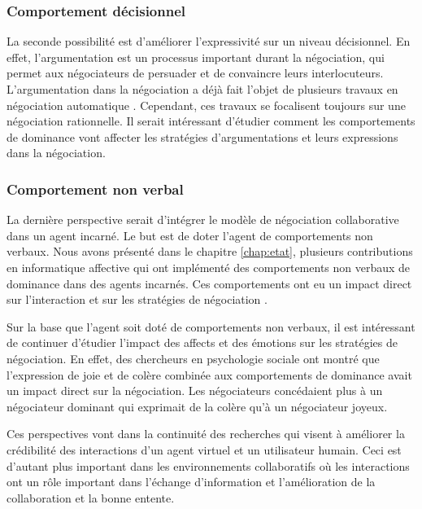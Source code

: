\subsubsection{Comportement décisionnel}

La seconde possibilité est d'améliorer l'expressivité sur un niveau décisionnel. En effet, l'argumentation est un processus important durant la négociation, qui permet aux négociateurs de persuader et de convaincre leurs interlocuteurs. L'argumentation dans la négociation a déjà fait l'objet de plusieurs travaux en négociation automatique \cite{toni2010argumentative,oliva2010argumentation}. Cependant, ces travaux se focalisent toujours sur une négociation rationnelle. Il serait intéressant d'étudier comment les comportements de dominance vont affecter les stratégies d'argumentations et leurs expressions dans la négociation.

\subsubsection{Comportement non verbal}

La dernière perspective serait d'intégrer le modèle de négociation collaborative dans un agent incarné. Le but est de doter l'agent de comportements non verbaux. Nous avons présenté dans le chapitre \ref{chap:etat}, plusieurs contributions en informatique affective qui ont implémenté des comportements non verbaux de dominance dans des agents incarnés. Ces comportements ont eu un impact direct sur l'interaction et sur les stratégies de négociation \cite{de2011effect,de2015humans}. 

Sur la base que l'agent soit doté de comportements non verbaux, il est intéressant de continuer d'étudier l'impact des affects et des émotions sur les stratégies de négociation.  En effet, des chercheurs en psychologie sociale \cite{van2006power} ont montré que l'expression de  joie et de colère combinée aux comportements de dominance avait un impact direct sur la négociation. Les négociateurs concédaient plus à un négociateur dominant qui exprimait de la colère qu'à un négociateur joyeux. 

Ces perspectives vont dans la continuité des recherches qui visent à améliorer la crédibilité des interactions d'un agent virtuel et un utilisateur humain. Ceci est d'autant plus important dans les environnements collaboratifs où les interactions ont un rôle important dans l'échange d'information et l'amélioration de la collaboration et la bonne entente.  

